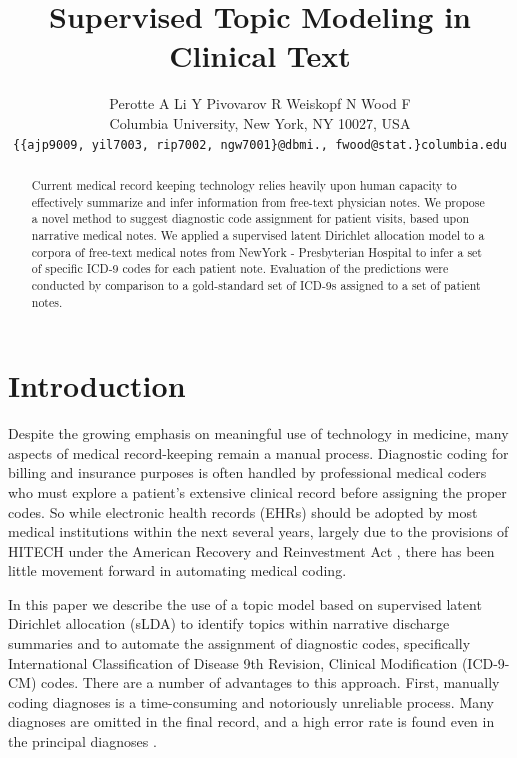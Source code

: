 \documentclass{article}
\title{Supervised Topic Modeling in Clinical Text}
\author{
Perotte A\hspace{1cm} Li Y \hspace{1cm} Pivovarov R \hspace{1cm} Weiskopf N\hspace{1cm} Wood F\\
Columbia University, New York, NY 10027, USA \\
\texttt{\{\{ajp9009, yil7003, rip7002, ngw7001\}@dbmi., fwood@stat.\}columbia.edu}
}
\begin{document}
\maketitle

\begin{abstract}
Current medical record keeping technology relies heavily upon human
capacity to effectively summarize and infer information from free-text
physician notes. We propose a novel method to suggest diagnostic code
assignment for patient visits, based upon narrative medical notes.
We applied a supervised latent Dirichlet allocation model to a corpora
of free-text medical notes from NewYork - Presbyterian Hospital to
infer a set of specific ICD-9 codes for each patient note. Evaluation
of the predictions were conducted by comparison to a gold-standard
set of ICD-9s assigned to a set of patient notes. 
\end{abstract}

\section{Introduction}

\label{sec:introduction} Despite the growing emphasis on meaningful
use of technology in medicine, many aspects of medical record-keeping
remain a manual process. Diagnostic coding for billing and insurance
purposes is often handled by professional medical coders who must
explore a patient's extensive clinical record before assigning the
proper codes. So while electronic health records (EHRs) should be
adopted by most medical institutions within the next several years,
largely due to the provisions of HITECH under the American Recovery
and Reinvestment Act \citep{Blumenthal2009}, there has been little
movement forward in automating medical coding.

In this paper we describe the use of a topic model based on supervised
latent Dirichlet allocation (sLDA) to identify topics within narrative
discharge summaries and to automate the assignment of diagnostic codes,
specifically International Classification of Disease 9th Revision,
Clinical Modification (ICD-9-CM) codes. There are a number of advantages
to this approach. First, manually coding diagnoses is a time-consuming
and notoriously unreliable process. Many diagnoses are omitted in
the final record, and a high error rate is found even in the principal
diagnoses \citep{Surjan1999}.
\end{document}
